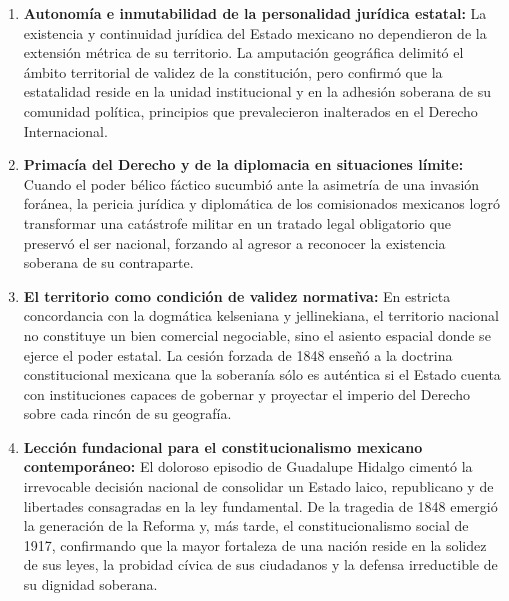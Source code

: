 \documentclass[12pt,spanish,letterpaper,oneside]{article}
\begin{document}
\begin{enumerate}
  \item \textbf{Autonom\'ia e inmutabilidad de la personalidad jur\'idica estatal:} La existencia y continuidad jur\'idica del Estado mexicano no dependieron de la extensi\'on m\'etrica de su territorio. La amputaci\'on geogr\'afica delimit\'o el \'ambito territorial de validez de la constituci\'on, pero confirm\'o que la estatalidad reside en la unidad institucional y en la adhesi\'on soberana de su comunidad pol\'itica, principios que prevalecieron inalterados en el Derecho Internacional.
  \item \textbf{Primac\'ia del Derecho y de la diplomacia en situaciones l\'imite:} Cuando el poder b\'elico f\'actico sucumbi\'o ante la asimetr\'ia de una invasi\'on for\'anea, la pericia jur\'idica y diplom\'atica de los comisionados mexicanos logr\'o transformar una cat\'astrofe militar en un tratado legal obligatorio que preserv\'o el ser nacional, forzando al agresor a reconocer la existencia soberana de su contraparte.
  \item \textbf{El territorio como condici\'on de validez normativa:} En estricta concordancia con la dogm\'atica kelseniana y jellinekiana, el territorio nacional no constituye un bien comercial negociable, sino el asiento espacial donde se ejerce el poder estatal. La cesi\'on forzada de 1848 ense\~n\'o a la doctrina constitucional mexicana que la soberan\'ia s\'olo es aut\'entica si el Estado cuenta con instituciones capaces de gobernar y proyectar el imperio del Derecho sobre cada rinc\'on de su geograf\'ia.
  \item \textbf{Lecci\'on fundacional para el constitucionalismo mexicano contempor\'aneo:} El doloroso episodio de Guadalupe Hidalgo ciment\'o la irrevocable decisi\'on nacional de consolidar un Estado laico, republicano y de libertades consagradas en la ley fundamental. De la tragedia de 1848 emergi\'o la generaci\'on de la Reforma y, m\'as tarde, el constitucionalismo social de 1917, confirmando que la mayor fortaleza de una naci\'on reside en la solidez de sus leyes, la probidad c\'ivica de sus ciudadanos y la defensa irreductible de su dignidad soberana.
\end{enumerate}
\end{document}
